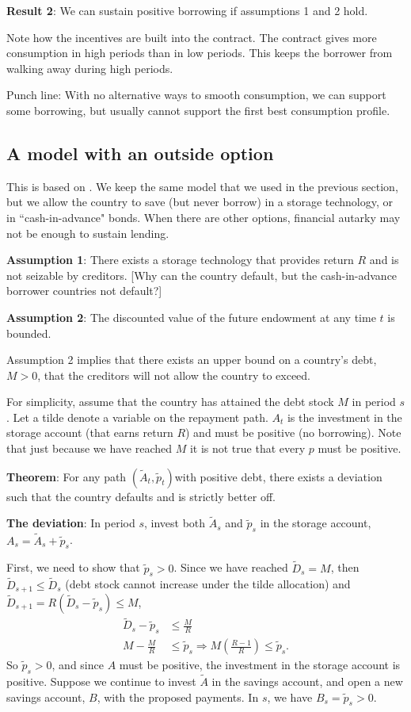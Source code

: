 \documentclass[11pt, pdftex]{article}
\begin{document}
\textbf{Result 2}: We can sustain positive borrowing if assumptions 1 and 2 hold.

	
Note how the incentives are built into the contract. The contract gives more consumption in high periods than in low periods.  This keeps the borrower from walking away during high periods.

Punch line: With no alternative ways to smooth consumption, we can support some borrowing, but usually cannot support the first best consumption profile.

\subsection{A model with an outside option}
This is based on \citet{bulowForget}.  We keep the same model that we used in the previous section, but we allow the country to save (but never borrow) in a storage technology, or in ``cash-in-advance" bonds.  When there are other options, financial autarky may not be enough to sustain lending.

\textbf{Assumption 1}: There exists a storage technology that provides return $R$ and is not seizable by creditors. [Why can the country default, but the cash-in-advance borrower countries not default?]

\textbf{Assumption 2}: The discounted value of the future endowment at any time $t$ is bounded.

Assumption 2 implies that there exists an upper bound on a country's debt, $M>0$, that the creditors will not allow the country to exceed.

For simplicity, assume that the country has attained the debt stock $M$ in period $s$.  Let a tilde denote a variable on the repayment path. ${A_t}$ is the investment in the storage account (that earns return $R$) and must be positive (no borrowing). Note that just because we have reached $M$ it is not true that every $p$ must be positive.

\textbf{Theorem}: For any path $\left(\tilde{A}_t, \tilde{p}_t \right)$with positive debt, there exists a deviation such that the country defaults and is strictly better off.

\textbf{The deviation}:
In period $s$, invest both ${\tilde A_s}$ and ${\tilde p_s}$ in the storage account, $A_s={\tilde A_s} + {\tilde p_s}$.

First, we need to show that $\tilde{p}_s>0$. Since we have reached ${\tilde D_s} = M$, then $\tilde{D}_{s+1}\leq \tilde{D}_s$ (debt stock cannot increase under the tilde allocation) and ${\tilde D_{s + 1}} = R\left( {{{\tilde D}_s} - {{\tilde p}_s}} \right) \leq M$,
\begin{align}
   {{{\tilde D}_s} - {{\tilde p}_s}}  &\leq \frac{M}{R} \\
  M - \frac{M}{R} & \leq {{\tilde p}_s} \Rightarrow M\left( {\frac{{R - 1}}{R}} \right) \leq {{\tilde p}_s}.
\end{align}
So ${\tilde p_s} > 0$, and since $A$ must be positive, the investment in the storage account is positive.  Suppose we continue to invest $\tilde{A}$ in the savings account, and open a new savings account, $B$, with the proposed payments. In $s$, we have $B_s=\tilde{p}_s>0$.
\end{document}
